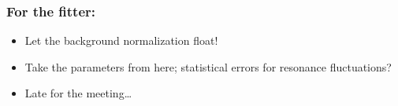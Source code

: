 \documentclass[compress]{beamer}
\begin{document}

\begin{frame}
\frametitle{For the fitter:}
\begin{itemize}
\item Let the background normalization float!
\item Take the parameters from here; statistical errors for resonance fluctuations?
\item Late for the meeting\ldots
\end{itemize}
\label{numpages}
\end{frame}
\end{document}
